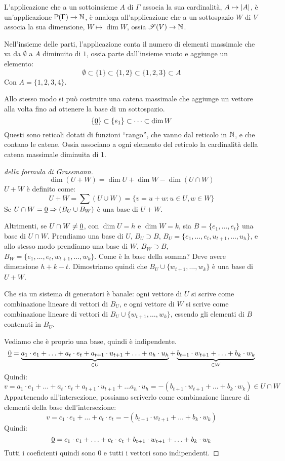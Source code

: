 L'applicazione che a un sottoinsieme $A$ di $\Gamma$ associa la sua cardinalit\`a, $A \mapsto \left\lvert{A}\right\rvert$, \`e un'applicazione $\mathbb{P}(\Gamma) \to \mathbb{N}$, \`e analoga all'applicazione che a un sottospazio $W$ di $V$ associa la sua dimensione, $W \mapsto \dim W$, ossia $\mathscr{S}(V) \to \mathbb{N}$.

Nell'insieme delle parti, l'applicazione conta il numero di elementi massimale che va da $\emptyset$ a $A$ diminuito di $1$, ossia parte dall'insieme vuoto e aggiunge un elemento:
\[
\emptyset \subset \{ 1 \} \subset \{ 1, 2 \} \subset \{ 1, 2, 3 \} \subset A
\]
Con $A = \{ 1, 2, 3, 4 \}$.

Allo stesso modo si pu\`o costruire una catena massimale che aggiunge un vettore alla volta fino ad ottenere la base di un sottospazio.
\[
\{ \underline{0} \} \subset \{ e_1 \} \subset \dots \subset \dim W
\]
Questi sono reticoli dotati di funzioni ``rango'', che vanno dal reticolo in $\mathbb{N}$, e che contano le catene. Ossia associano a ogni elemento del reticolo la cardinalit\`a della catena massimale diminuita di 1.

\begin{proof}[della formula di Grassmann]
\[
\dim(U + W) = \dim U + \dim W - \dim (U \cap W)
\]
$U + W$ \`e definito come:
\[
U + W = \sum (U \cup W) = \{ v = u + w : u \in U, w \in W \}
\]
Se $U \cap W = \underline{0} \Rightarrow (B_U \cup B_W)$ \`e una base di $U + W$.

Altrimenti, se $U \cap W \neq \underline{0}$, con $\dim U = h$ e $\dim W = k$, sia $B = \{ e_{1}, \ldots, e_{t} \}$ una base di $U \cap W$. Prendiamo una base di $U$, $B_U \supset B$, $B_U = \{ e_{1}, \ldots, e_{t} , u_{t+1}, \ldots, u_{h} \}$, e allo stesso modo prendiamo una base di $W$, $B_W \supset B$, $B_W = \{ e_{1}, \ldots, e_{t}, w_{t+1}, \ldots, w_{k} \}$. Come \`e la base della somma? Deve avere dimensione $h + k - t$. Dimostriamo quindi che $B_U \cup \{ w_{t+1}, \ldots, w_{k} \}$ \`e una base di $U + W$.

Che sia un sistema di generatori \`e banale: ogni vettore di $U$ si scrive come combinazione lineare di vettori di $B_U$, e ogni vettore di $W$ si scrive come combinazione lineare di vettori di $B_U \cup \{ w_{t+1}, \ldots, w_{k} \}$, essendo gli elementi di $B$ contenuti in $B_U$.

Vediamo che \`e proprio una base, quindi \`e indipendente.
\[
\underline{0} = \underbrace{a_1 \cdot e_1 + \ldots + a_t \cdot e_t + a_{t+1} \cdot u_{t+1} + \ldots + a_h \cdot u_h}_{\in U} + \underbrace{b_{t+1} \cdot w_{t+1} + \ldots + b_k \cdot w_k}_{\in W}
\]
Quindi:
\[
v = a_1 \cdot e_1 + \ldots + a_t \cdot e_t + a_{t+1} \cdot u_{t+1} + \ldots a_h \cdot u_h = -(b_{t+1} \cdot w_{t+1} + \ldots + b_k \cdot w_k) \in U \cap W
\]
Appartenendo all'intersezione, possiamo scriverlo come combinazione lineare di elementi della base dell'intersezione:
\[
v = c_1 \cdot e_1 + \ldots + c_t \cdot e_t =  - (b_{t+1} \cdot w_{t+1} + \ldots + b_k \cdot w_k)
\]
Quindi:
\[
\underline{0} = c_1 \cdot e_1 + \ldots + c_t \cdot e_t + b_{t+1} \cdot w_{t+1} + \ldots + b_k \cdot w_k
\]
Tutti i coeficienti quindi sono 0 e tutti i vettori sono indipendenti.
\end{proof}

